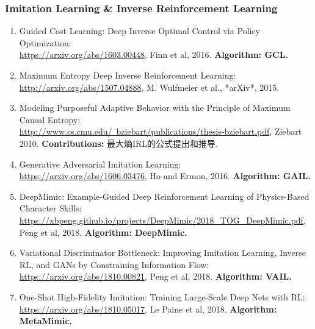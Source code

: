 \documentclass[lang=cn,11pt,a4paper]{elegant_template}
\begin{document}
\subsubsection{Imitation Learning \& Inverse Reinforcement Learning}
\begin{enumerate}
    \item Guided Cost Learning: Deep Inverse Optimal Control via Policy Optimization:\\ \href{https://arxiv.org/abs/1603.00448}{https://arxiv.org/abs/1603.00448}, Finn et al, 2016. \textbf{Algorithm: GCL.}
    \item Maximum Entropy Deep Inverse Reinforcement Learning:\\ \href{http://arxiv.org/abs/1507.04888}{http://arxiv.org/abs/1507.04888}, M. Wulfmeier et al., *arXiv*, 2015.
    \item Modeling Purposeful Adaptive Behavior with the Principle of Maximum Causal Entropy:\\ \href{http://www.cs.cmu.edu/~bziebart/publications/thesis-bziebart.pdf}{http://www.cs.cmu.edu/~bziebart/publications/thesis-bziebart.pdf}, Ziebart 2010. \textbf{Contributions:} 最大熵IRL的公式提出和推导.
    \item Generative Adversarial Imitation Learning:\\ \href{https://arxiv.org/abs/1606.03476}{https://arxiv.org/abs/1606.03476}, Ho and Ermon, 2016. \textbf{Algorithm: GAIL.}
    \item DeepMimic: Example-Guided Deep Reinforcement Learning of Physics-Based Character Skills:\\ \href{https://xbpeng.github.io/projects/DeepMimic/2018_TOG_DeepMimic.pdf}{https://xbpeng.github.io/projects/DeepMimic/2018\_TOG\_DeepMimic.pdf}, Peng et al, 2018. \textbf{Algorithm: DeepMimic.}
    \item Variational Discriminator Bottleneck: Improving Imitation Learning, Inverse RL, and GANs by Constraining Information Flow:\\ \href{https://arxiv.org/abs/1810.00821}{https://arxiv.org/abs/1810.00821}, Peng et al, 2018. \textbf{Algorithm: VAIL.}
    \item One-Shot High-Fidelity Imitation: Training Large-Scale Deep Nets with RL:\\ \href{https://arxiv.org/abs/1810.05017}{https://arxiv.org/abs/1810.05017}, Le Paine et al, 2018. \textbf{Algorithm: MetaMimic.}
\end{enumerate}
\end{document}
